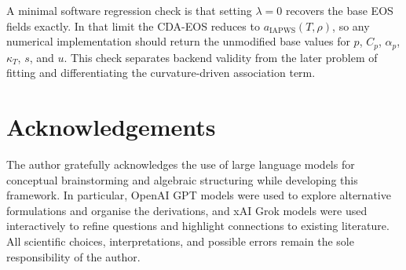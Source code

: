 \documentclass[12pt]{article}
\begin{document}
A minimal software regression check is that setting $\lambda=0$ recovers the base EOS fields exactly. In that limit the CDA-EOS reduces to $a_{\mathrm{IAPWS}}(T,\rho)$, so any numerical implementation should return the unmodified base values for $p$, $C_p$, $\alpha_p$, $\kappa_T$, $s$, and $u$. This check separates backend validity from the later problem of fitting and differentiating the curvature-driven association term.

\section*{Acknowledgements}

The author gratefully acknowledges the use of large language models for conceptual brainstorming and algebraic structuring while developing this framework. In particular, OpenAI GPT models were used to explore alternative formulations and organise the derivations, and xAI Grok models were used interactively to refine questions and highlight connections to existing literature. All scientific choices, interpretations, and possible errors remain the sole responsibility of the author.
\end{document}
